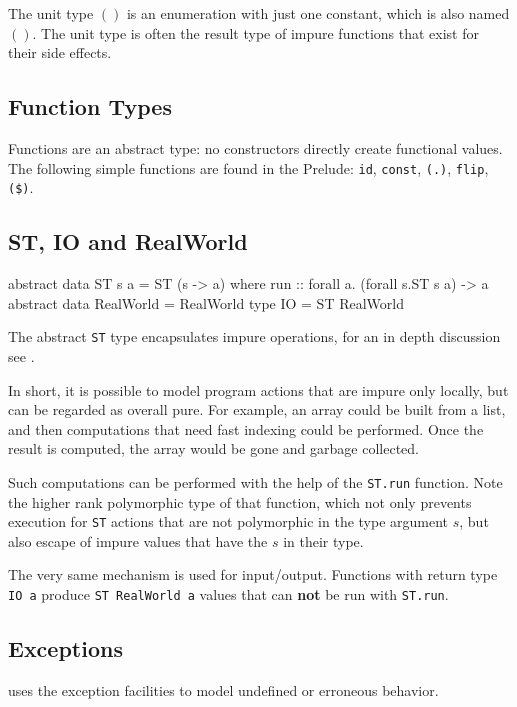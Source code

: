 The unit type $()$ is an enumeration with just one constant, which is also named $()$. 
The unit type is often the result type of impure functions that exist for their side effects.


\subsection{Function Types}

Functions are an abstract type: no constructors directly create functional values.
The following simple functions are found in the Prelude: \texttt{id}, \texttt{const}, \texttt{(.)}, \texttt{flip}, \texttt{(\$)}.

\subsection{ST, IO and RealWorld}

\begin{code}
abstract data ST s a = ST (s -> a)
    where  run :: forall a. (forall s.ST s a) -> a
abstract data RealWorld = RealWorld
type IO = ST RealWorld 
\end{code}

The abstract \texttt{ST} type encapsulates impure operations, for an in depth discussion see \cite{lazyst}.

In short, it is possible to model program actions that are impure only locally, but can be regarded as overall pure. For example, an array could be built from a list, and then computations  that need fast indexing could be performed. Once the result is computed, the array would be gone and garbage collected.

Such computations can be performed with the help of the \texttt{ST.run} function. Note the higher rank polymorphic type of that function, which not only prevents execution for \texttt{ST} actions that are not polymorphic in the type argument $s$, but also escape of impure values that have the $s$ in their type.

The very same mechanism is used for input/output. Functions with return type \texttt{IO a} produce \texttt{ST RealWorld a} values that can \textbf{not} be run with \texttt{ST.run}.


\subsection{Exceptions}


\frege{} uses the \java{} exception facilities to model undefined or erroneous behavior.

